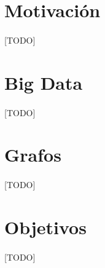 \documentclass{subfiles}
\begin{document}
    \section{Motivación}
    \label{sec:introduction_motivation}

      \paragraph{}
      [TODO]

    \section{Big Data}
    \label{sec:introduction_big_data}

      \paragraph{}
      [TODO]

    \section{Grafos}
    \label{sec:introduction_graphs}

      \paragraph{}
      [TODO]

    \section{Objetivos}
    \label{sec:introduction_goals}

      \paragraph{}
      [TODO]
\end{document}

